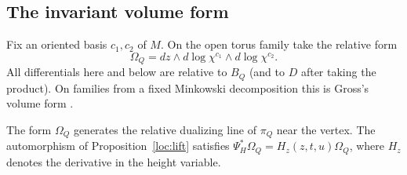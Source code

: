\subsection{The invariant volume form}
Fix an oriented basis $c_1,c_2$ of $M$. On the open torus family take
the relative form
\begin{equation}\label{loc:form}
       \Omega_Q=dz\wedge d\log\chi^{c_1}\wedge d\log\chi^{c_2}.
\end{equation}
All differentials here and below are relative to $B_Q$ (and to $D$
after taking the product). On families from a fixed Minkowski
decomposition this is Gross's volume form
\cite[Proposition~3.2]{GrossSL}.

\begin{lemma}\label{loc:generator}
The form $\Omega_Q$ generates the relative dualizing line of $\pi_Q$
near the vertex. The automorphism of Proposition~\ref{loc:lift}
satisfies $\Psi_H^*\Omega_Q=H_z(z,t,u)\Omega_Q$, where $H_z$ denotes
the derivative in the height variable.
\end{lemma}

